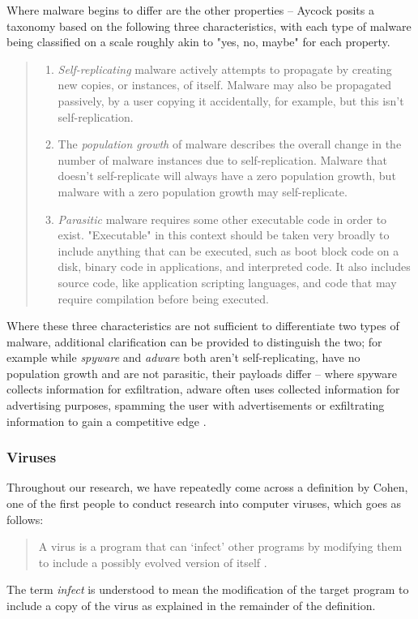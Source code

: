 Where malware begins to differ are the other properties -- Aycock posits a taxonomy based on the following three 
characteristics, with each type of malware being classified on a scale roughly akin to "yes, no, maybe"
for each property.
\begin{quote}
  \begin{enumerate}
    \item \emph{Self-replicating} malware actively attempts to propagate by creating new copies, or instances, 
      of itself. Malware may also be propagated passively, by a user copying it accidentally, for example, 
      but this isn't self-replication.
    \item The \emph{population growth} of malware describes the overall change in the number of malware instances due to
      self-replication. Malware that doesn't self-replicate will always have a zero population growth, but malware with a
      zero population growth may self-replicate.
    \item \emph{Parasitic} malware requires some other executable code in order to exist. "Executable" in this context 
      should be taken very broadly to include anything that can be executed, such as boot block code on a disk, binary 
      code in applications, and interpreted code. It also includes source code, like application scripting languages,
      and code that may require compilation before being executed.
  \end{enumerate}
  \cite[p.~11-12]{aycock-book}
\end{quote}
Where these three characteristics are not sufficient to differentiate two types of malware, additional clarification can
be provided to distinguish the two; for example while \emph{spyware} and \emph{adware} both aren't self-replicating,
have no population growth and are not parasitic, their payloads differ -- where spyware collects information for
exfiltration, adware often uses collected information for advertising purposes, spamming the user with advertisements
or exfiltrating information to gain a competitive edge \cite[p.~16-17]{aycock-book}. 

\subsubsection{Viruses}
Throughout our research, we have repeatedly come across a definition by Cohen, one of the first 
people to conduct research into computer viruses, which goes as follows: 
\begin{quote}
A virus is a program that can ‘infect’ other programs by modifying them to include a possibly 
evolved version of itself \cite{cohen-virus-course}.
\end{quote}
The term \emph{infect} is understood to mean the modification of the target program to include a 
copy of the virus as explained in the remainder of the definition. 

